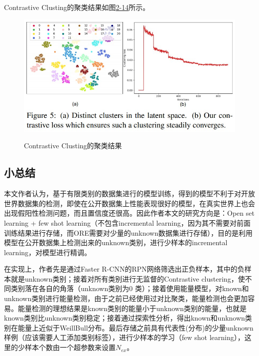 Contrastive Clusting的聚类结果如图\href{fig:2-14}{2-14}所示。
\begin{figure}
  \centering
  \includegraphics[width=5in]{figure/example/ORE8.jpg}\\
  \caption{Contrastive Clusting的聚类结果}
  \label{}
\end{figure}


\subsection{小总结}

本文作者认为，基于有限类别的数据集进行的模型训练，得到的模型不利于对开放世界数据集的检测，即使在公开数据集上性能表现很好的模型，在真实世界上也会出现假阳性检测问题，而且置信度还很高。因此作者本文的研究方向是：Open set learning + few shot learning（不包含incremental learning，因为其不需要对前面训练结果进行存储，而ORE需要对少量的unknown数据集进行存储），目的是利用模型在公开数据集上检测出来的unknown类别，进行少样本的incremental learning，对模型进行精调。

在实现上，作者先是通过Faster R-CNN的RPN网络筛选出正负样本，其中的负样本就是unknown类别；接着对所有类别进行无监督的Contrastive clustering，使不同类别落在各自的角落（unknown类别为0 类）；接着使用能量模型，对known和unknown类别进行能量检测，由于之前已经使用过对比聚类，能量检测也会更加容易。能量检测的理想结果是known类别的能量小于unknown类别的能量，也就是known类别比unknown类别稳定；接着通过探索性分析，得出known和unknown类别在能量上近似于WeillBull分布。最后存储之前具有代表性(分布)的少量unknown样例（应该需要人工添加类别标签），进行少样本的学习（few shot learning），这里的少样本个数由一个超参数来设置$N_{ex}$。\\

